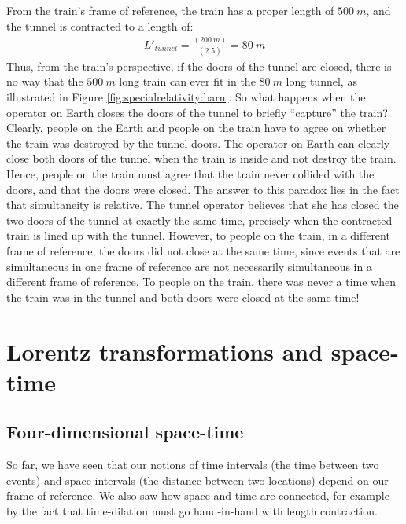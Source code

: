 From the train's frame of reference, the train has a proper length of $\SI{500}{m}$, and the tunnel is contracted to a length of:
\begin{align*}
L'_{tunnel}=\frac{(\SI{200}{m})}{(2.5)}=\SI{80}{m}
\end{align*}
Thus, from the train's perspective, if the doors of the tunnel are closed, there is no way that the $\SI{500}{m}$ long train can ever fit in the $\SI{80}{m}$ long tunnel, as illustrated in Figure \ref{fig:specialrelativity:barn}. So what happens when the operator on Earth closes the doors of the tunnel to briefly ``capture'' the train? 
Clearly, people on the Earth and people on the train have to agree on whether the train was destroyed by the tunnel doors. The operator on Earth can clearly close both doors of the tunnel when the train is inside and not destroy the train. Hence, people on the train must agree that the train never collided with the doors, and that the doors were closed. The answer to this paradox lies in the fact that simultaneity is relative. The tunnel operator believes that she has closed the two doors of the tunnel at exactly the same time, precisely when the contracted train is lined up with the tunnel. However, to people on the train, in a different frame of reference, the doors did not close at the same time, since events that are simultaneous in one frame of reference are not necessarily simultaneous in a different frame of reference. To people on the train, there was never a time when the train was in the tunnel and both doors were closed at the same time!

\section{Lorentz transformations and space-time}
\subsection{Four-dimensional space-time}
So far, we have seen that our notions of time intervals (the time between two events) and space intervals (the distance between two locations) depend on our frame of reference. We also saw how space and time are connected, for example by the fact that time-dilation must go hand-in-hand with length contraction.

